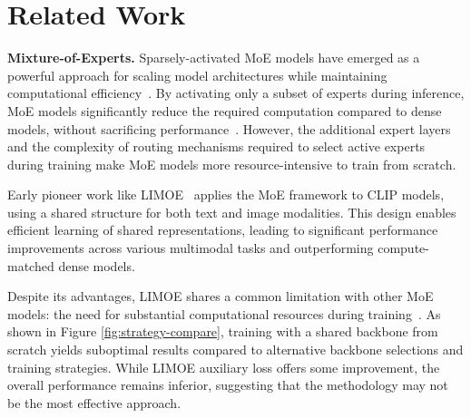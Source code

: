 \section{Related Work}
\label{related-work}

\textbf{Mixture-of-Experts.} Sparsely-activated MoE models have emerged as a powerful approach for scaling model architectures while maintaining computational efficiency~\cite{shazeer2017outrageouslylargeneuralnetworks,fedus2022switchtransformersscalingtrillion}. By activating only a subset of experts during inference, MoE models significantly reduce the required computation compared to dense models, without sacrificing performance~\cite{jiang2024mixtralexperts,dai2024deepseekmoeultimateexpertspecialization,xue2024openmoeearlyeffortopen}. However, the additional expert layers and the complexity of routing mechanisms required to select active experts during training make MoE models more resource-intensive to train from scratch.

Early pioneer work like LIMOE~\cite{mustafa2022multimodalcontrastivelearninglimoe} applies the MoE framework to CLIP models, using a shared structure for both text and image modalities. This design enables efficient learning of shared representations, leading to significant performance improvements across various multimodal tasks and outperforming compute-matched dense models.

Despite its advantages, LIMOE shares a common limitation with other MoE models: the need for substantial computational resources during training~\cite{du2024revisitingmoedensespeedaccuracy}. 
As shown in Figure \ref{fig:strategy-compare}, training with a shared backbone from scratch yields suboptimal results compared to alternative backbone selections and training strategies. While LIMOE auxiliary loss offers some improvement, the overall performance remains inferior, suggesting that the methodology may not be the most effective approach.


